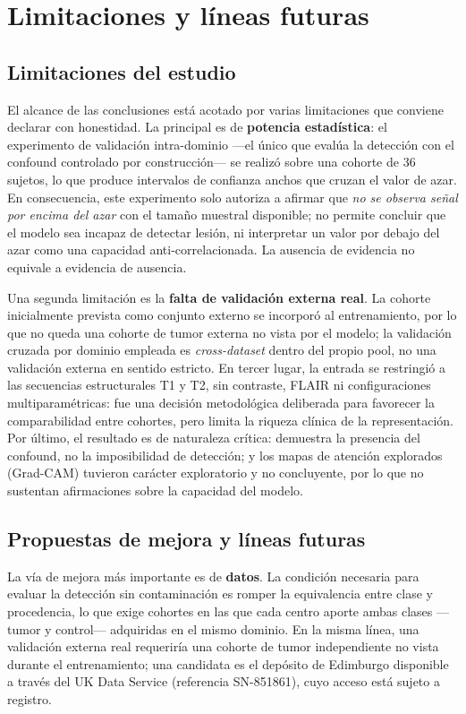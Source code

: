 \chapter{Limitaciones y líneas futuras}

\section{Limitaciones del estudio}

El alcance de las conclusiones está acotado por varias limitaciones que conviene
declarar con honestidad. La principal es de \textbf{potencia estadística}: el
experimento de validación intra-dominio ---el único que evalúa la detección con el
confound controlado por construcción--- se realizó sobre una cohorte de 36
sujetos, lo que produce intervalos de confianza anchos que cruzan el valor de
azar. En consecuencia, este experimento solo autoriza a afirmar que \emph{no se
observa señal por encima del azar} con el tamaño muestral disponible; no permite
concluir que el modelo sea incapaz de detectar lesión, ni interpretar un valor por
debajo del azar como una capacidad anti-correlacionada. La ausencia de evidencia
no equivale a evidencia de ausencia.

Una segunda limitación es la \textbf{falta de validación externa real}. La cohorte
inicialmente prevista como conjunto externo se incorporó al entrenamiento, por lo
que no queda una cohorte de tumor externa no vista por el modelo; la validación
cruzada por dominio empleada es \emph{cross-dataset} dentro del propio pool, no una
validación externa en sentido estricto. En tercer lugar, la entrada se restringió
a las secuencias estructurales T1 y T2, sin contraste, FLAIR ni configuraciones
multiparamétricas: fue una decisión metodológica deliberada para favorecer la
comparabilidad entre cohortes, pero limita la riqueza clínica de la
representación. Por último, el resultado es de naturaleza crítica: demuestra la
presencia del confound, no la imposibilidad de detección; y los mapas de atención
explorados (Grad-CAM) tuvieron carácter exploratorio y no concluyente, por lo que
no sustentan afirmaciones sobre la capacidad del modelo.

\section{Propuestas de mejora y líneas futuras}

La vía de mejora más importante es de \textbf{datos}. La condición necesaria para
evaluar la detección sin contaminación es romper la equivalencia entre clase y
procedencia, lo que exige cohortes en las que cada centro aporte ambas clases
---tumor y control--- adquiridas en el mismo dominio. En la misma línea, una
validación externa real requeriría una cohorte de tumor independiente no vista
durante el entrenamiento; una candidata es el depósito de Edimburgo disponible a
través del UK Data Service (referencia SN-851861), cuyo acceso está sujeto a
registro.

